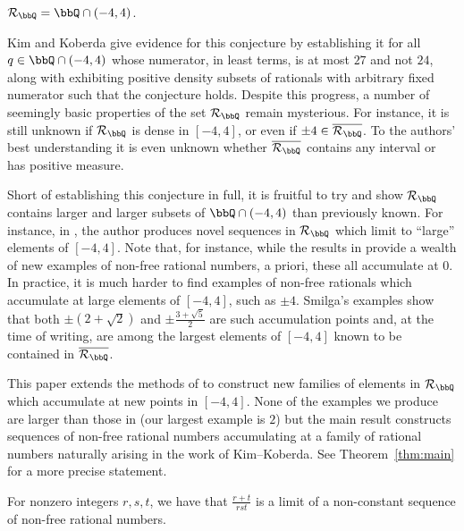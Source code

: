 \documentclass[11 pt]{amsart}
\begin{document}
\begin{conjecture}
\label{kimkoberdaconjecture}
    $\mathcal{R}_\bbQ=\bbQ\cap(-4,4)$.
\end{conjecture}

Kim and Koberda give evidence for this conjecture by establishing it for all $q\in\bbQ\cap(-4,4)$ whose numerator, in least terms, is at most $27$ and not $24$, along with exhibiting positive density subsets of rationals with arbitrary fixed numerator such that the conjecture holds. Despite this progress, a number of seemingly basic properties of the set $\mathcal{R}_\bbQ$ remain mysterious. For instance, it is still unknown if $\mathcal{R}_\bbQ$ is dense in $[-4,4]$, or even if $\pm 4\in\overline{\mathcal{R}_\bbQ}$. To the authors' best understanding it is even unknown whether $\overline{\mathcal{R}_\bbQ}$ contains any interval or has positive measure.

Short of establishing this conjecture in full, it is fruitful to try and show $\mathcal{R}_\bbQ$ contains larger and larger subsets of $\bbQ\cap(-4,4)$ than previously known. For instance, in \cite{Smilga2021}, the author produces novel sequences in $\mathcal{R}_\bbQ$ which limit to ``large'' elements of $[-4,4]$. Note that, for instance, while the results in \cite{kimkoberda} provide a wealth of new examples of non-free rational numbers, a priori, these all accumulate at $0$. In practice, it is much harder to find examples of non-free rationals which accumulate at large elements of $[-4,4]$, such as $\pm 4$. Smilga's examples show that both $\pm(2+\sqrt{2})$ and $\pm\frac{3+\sqrt{5}}{2}$ are such accumulation points and, at the time of writing, are among the largest elements of $[-4,4]$ known to be contained in $\overline{\mathcal{R}_\bbQ}$.

This paper extends the methods of \cite{Smilga2021} to construct new families of elements in $\mathcal{R}_\bbQ$ which accumulate at new points in $[-4,4]$. None of the examples we produce are larger than those in \cite{Smilga2021} (our largest example is $2$) but the main result constructs sequences of non-free rational numbers accumulating at a family of rational numbers naturally arising in the work of Kim--Koberda. See Theorem~\ref{thm:main} for a more precise statement.

\begin{theorem}
\label{thm:main2}
    For nonzero integers $r,s,t$, we have that $\frac{r+t}{rst}$ is a limit of a non-constant sequence of non-free rational numbers.
\end{theorem}
\end{document}
